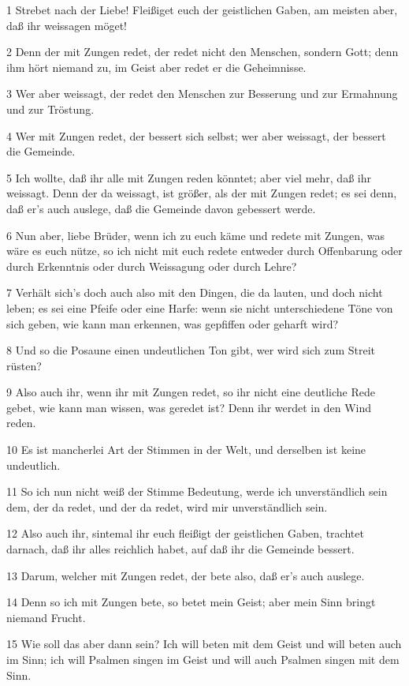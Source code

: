\par 1 Strebet nach der Liebe! Fleißiget euch der geistlichen Gaben, am meisten aber, daß ihr weissagen möget!
\par 2 Denn der mit Zungen redet, der redet nicht den Menschen, sondern Gott; denn ihm hört niemand zu, im Geist aber redet er die Geheimnisse.
\par 3 Wer aber weissagt, der redet den Menschen zur Besserung und zur Ermahnung und zur Tröstung.
\par 4 Wer mit Zungen redet, der bessert sich selbst; wer aber weissagt, der bessert die Gemeinde.
\par 5 Ich wollte, daß ihr alle mit Zungen reden könntet; aber viel mehr, daß ihr weissagt. Denn der da weissagt, ist größer, als der mit Zungen redet; es sei denn, daß er's auch auslege, daß die Gemeinde davon gebessert werde.
\par 6 Nun aber, liebe Brüder, wenn ich zu euch käme und redete mit Zungen, was wäre es euch nütze, so ich nicht mit euch redete entweder durch Offenbarung oder durch Erkenntnis oder durch Weissagung oder durch Lehre?
\par 7 Verhält sich's doch auch also mit den Dingen, die da lauten, und doch nicht leben; es sei eine Pfeife oder eine Harfe: wenn sie nicht unterschiedene Töne von sich geben, wie kann man erkennen, was gepfiffen oder geharft wird?
\par 8 Und so die Posaune einen undeutlichen Ton gibt, wer wird sich zum Streit rüsten?
\par 9 Also auch ihr, wenn ihr mit Zungen redet, so ihr nicht eine deutliche Rede gebet, wie kann man wissen, was geredet ist? Denn ihr werdet in den Wind reden.
\par 10 Es ist mancherlei Art der Stimmen in der Welt, und derselben ist keine undeutlich.
\par 11 So ich nun nicht weiß der Stimme Bedeutung, werde ich unverständlich sein dem, der da redet, und der da redet, wird mir unverständlich sein.
\par 12 Also auch ihr, sintemal ihr euch fleißigt der geistlichen Gaben, trachtet darnach, daß ihr alles reichlich habet, auf daß ihr die Gemeinde bessert.
\par 13 Darum, welcher mit Zungen redet, der bete also, daß er's auch auslege.
\par 14 Denn so ich mit Zungen bete, so betet mein Geist; aber mein Sinn bringt niemand Frucht.
\par 15 Wie soll das aber dann sein? Ich will beten mit dem Geist und will beten auch im Sinn; ich will Psalmen singen im Geist und will auch Psalmen singen mit dem Sinn.
